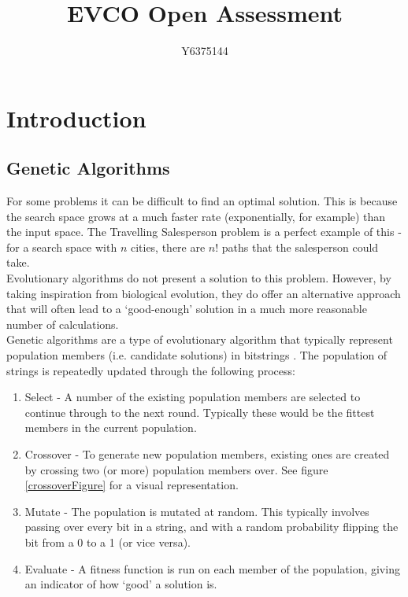 \documentclass[]{report}
\title{EVCO Open Assessment}
\author{Y6375144}
\begin{document}
\maketitle
\chapter{Introduction}

\section{Genetic Algorithms}

For some problems it can be difficult to find an optimal solution. This is because the search space grows at a much faster rate (exponentially, for example) than the input space. The Travelling Salesperson problem is a perfect example of this - for a search space with $n$ cities, there are $n!$ paths that the salesperson could take. \cite{ECIntro}\\

Evolutionary algorithms do not present a solution to this problem. However, by taking inspiration from biological evolution, they do offer an alternative approach that will often lead to a `good-enough' solution in a much more reasonable number of calculations. \\

Genetic algorithms are a type of evolutionary algorithm that typically represent population members (i.e. candidate solutions) in bitstrings \cite{MitchelGA}. The population of strings is repeatedly updated through the following process:

\begin{enumerate}
	\item Select - A number of the existing population members are selected to continue through to the next round. Typically these would be the fittest members in the current population.
	\item Crossover - To generate new population members, existing ones are created by crossing two (or more) population members over. See figure \ref{crossoverFigure} for a visual representation.
	\item Mutate - The population is mutated at random. This typically involves passing over every bit in a string, and with a random probability flipping the bit from a 0 to a 1 (or vice versa).
	\item Evaluate - A fitness function is run on each member of the population, giving an indicator of how `good' a solution is.
\end{enumerate}
\end{document}
